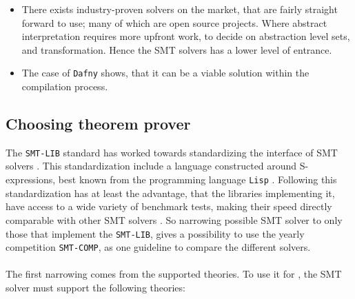 \begin{itemize}
    \item There exists industry-proven solvers on the market, that are fairly straight forward
          to use; many of which are open source projects. Where abstract interpretation requires
          more upfront work, to decide on
          abstraction level sets, and transformation. Hence the SMT solvers has a lower level
          of entrance.

    \item The case of \texttt{Dafny} shows, that it can be a viable solution within the compilation
          process.
\end{itemize}


\subsection{Choosing theorem prover \rr}
The \texttt{SMT-LIB} standard has worked towards standardizing the interface of SMT solvers \cite{smtlib}.
This standardization include a language constructed around S-expressions, best known from
the programming language \texttt{Lisp} \cite{pld}. Following this standardization has at least
the advantage, that the libraries implementing it, have access to a wide variety of benchmark tests,
making their speed directly comparable with other SMT solvers \cite{smtlib}. So narrowing possible
SMT solver to only those that implement the \texttt{SMT-LIB}, gives a possibility to use the
yearly competition \texttt{SMT-COMP}, as one guideline to compare the different solvers.
\\
\\
The first narrowing comes from the supported theories. To use it for \lan, the SMT solver must
support the following theories:


